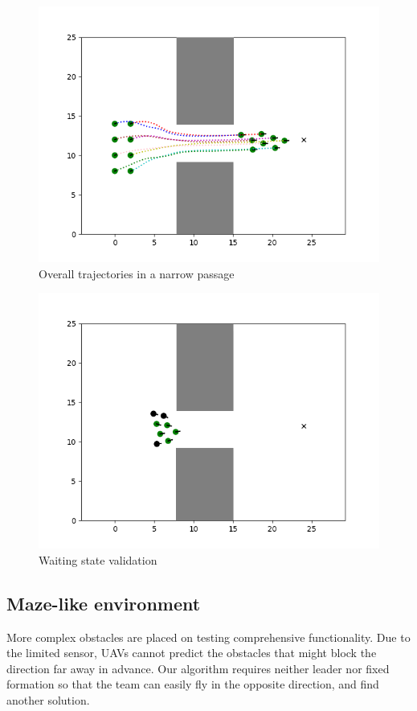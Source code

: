 \begin{figure}[H]
    \centering
    \includegraphics[scale=1]{figures/trail_overall.png}
    \caption{Overall trajectories in a narrow passage}
    \label{fig:narrow}
\end{figure}
\begin{figure}[H]
    \centering
    \includegraphics[scale=1]{figures/trail_enter.png}
    \caption{Waiting state validation}
    \label{fig:wait}
\end{figure}

\subsection{Maze-like environment}
More complex obstacles are placed on testing comprehensive functionality. Due to the limited sensor, UAVs cannot predict the obstacles that might block the direction far away in advance. Our algorithm requires neither leader nor fixed formation so that the team can easily fly in the opposite direction, and find another solution.

